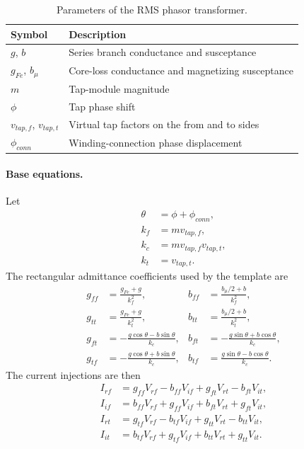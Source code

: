 \begin{table}[H]
    \centering
    \caption{Parameters of the RMS phasor transformer.}
    \begin{tabular}{ll}
        \toprule
        Symbol & Description \\
        \midrule
        $g$, $b$ & Series branch conductance and susceptance \\
        $g_{Fe}$, $b_\mu$ & Core-loss conductance and magnetizing susceptance \\
        $m$ & Tap-module magnitude \\
        $\phi$ & Tap phase shift \\
        $v_{tap,f}$, $v_{tap,t}$ & Virtual tap factors on the from and to sides \\
        $\phi_{conn}$ & Winding-connection phase displacement \\
        \bottomrule
    \end{tabular}
\end{table}

\paragraph{Base equations.}
Let
\begin{align}
    \theta &= \phi + \phi_{conn}, \\
    k_f &= m v_{tap,f}, \\
    k_c &= m v_{tap,f}v_{tap,t}, \\
    k_t &= v_{tap,t}.
\end{align}
The rectangular admittance coefficients used by the template are
\begin{align}
    g_{ff} &= \frac{g_{Fe}+g}{k_f^2}, &
    b_{ff} &= \frac{b_\mu/2+b}{k_f^2}, \\
    g_{tt} &= \frac{g_{Fe}+g}{k_t^2}, &
    b_{tt} &= \frac{b_\mu/2+b}{k_t^2}, \\
    g_{ft} &= -\frac{g\cos\theta-b\sin\theta}{k_c}, &
    b_{ft} &= -\frac{g\sin\theta+b\cos\theta}{k_c}, \\
    g_{tf} &= -\frac{g\cos\theta+b\sin\theta}{k_c}, &
    b_{tf} &= \frac{g\sin\theta-b\cos\theta}{k_c}.
\end{align}
The current injections are then
\begin{align}
    I_{rf} &= g_{ff}V_{rf}-b_{ff}V_{if}+g_{ft}V_{rt}-b_{ft}V_{it}, \\
    I_{if} &= b_{ff}V_{rf}+g_{ff}V_{if}+b_{ft}V_{rt}+g_{ft}V_{it}, \\
    I_{rt} &= g_{tf}V_{rf}-b_{tf}V_{if}+g_{tt}V_{rt}-b_{tt}V_{it}, \\
    I_{it} &= b_{tf}V_{rf}+g_{tf}V_{if}+b_{tt}V_{rt}+g_{tt}V_{it}.
\end{align}

